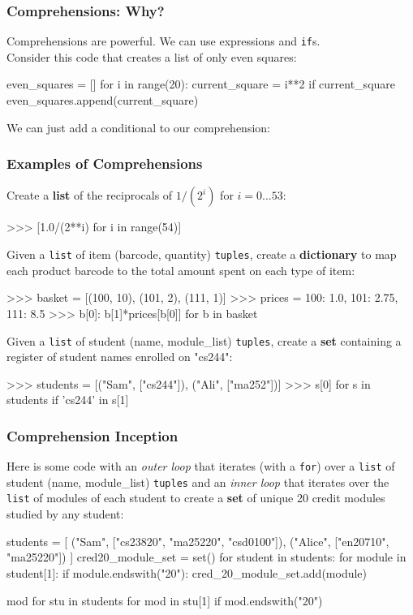 \documentclass{beamer}
\begin{document}
\begin{frame}[fragile]
\frametitle{Comprehensions: Why?}

Comprehensions are powerful. We can use expressions and \texttt{if}s.\\
Consider this code that creates a list of only even squares:
\begin{code}
even_squares = []
for i in range(20):
    current_square = i**2
    if current_square %
        even_squares.append(current_square)
\end{code}

\vskip 0.3cm
We can just add a conditional to our comprehension:
\end{frame}


\begin{frame}[fragile]
\frametitle{Examples of Comprehensions}
Create a \textbf{list} of the reciprocals of $1/(2^i)$ for $i=0...53$:
\begin{code}
>>> [1.0/(2**i) for i in range(54)]
\end{code}

\vskip 0.3cm
Given a \texttt{list} of item (barcode, quantity) \texttt{tuples},
create a \textbf{dictionary} to map each product
barcode to the total amount spent on each type of item:
\begin{code}
>>> basket = [(100, 10), (101, 2), (111, 1)]
>>> prices = {100: 1.0, 101: 2.75, 111: 8.5}
>>> {b[0]: b[1]*prices[b[0]] for b in basket}
\end{code}

\vskip 0.3cm
Given a \texttt{list} of student (name, module\_list) \texttt{tuples},
create a \textbf{set} containing a register of student names enrolled on "cs244":
\begin{code}
>>> students = [("Sam", ["cs244"]), ("Ali", ["ma252"])]
>>> {s[0] for s in students if 'cs244' in s[1]}
\end{code}
\end{frame}


\begin{frame}[fragile]
\frametitle{Comprehension Inception}
Here is some code with an \textit{outer loop} that iterates (with a \texttt{for})
over a \texttt{list} of student (name, module\_list) \texttt{tuples} and an
\textit{inner loop} that iterates over the \texttt{list} of modules of each student
to create a \textbf{set} of unique 20 credit modules studied by any student:

\begin{code}
students = [
    ("Sam", ["cs23820", "ma25220", "csd0100"]),
    ("Alice", ["en20710", "ma25220"])
]
cred20_module_set = set()
for student in students:
    for module in student[1]:
        if module.endswith("20"):
            cred_20_module_set.add(module)
\end{code}

\begin{code}
{mod for stu in students
     for mod in stu[1] if mod.endswith("20")}
\end{code}
\end{frame}
\end{document}
